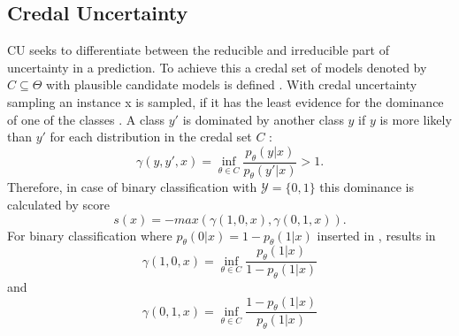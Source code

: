 \subsection{Credal Uncertainty}  
\label{subsec:credal_uncertainty}

\Ac{CU} seeks to differentiate between the reducible and irreducible part of uncertainty in a prediction.
To achieve this a credal set of models denoted by $C \subseteq \Theta$ with plausible candidate models is defined \cite{nguyen2021howtomeasure}.
With credal uncertainty sampling an instance x is sampled, if it has the least evidence for the dominance of one of the classes \cite{nguyen2021howtomeasure}.
A class $y'$ is dominated by another class $y$ if $y$ is more likely than $y'$ for each distribution in the credal set $C$ \cite{nguyen2021howtomeasure}:
\begin{equation} \label{eq:credal_uncertainty_dominance}
\gamma(y,y',x) = \inf_{\theta \in C} \frac{p_{\theta}(y | x)}{p_{\theta}(y' | x)} > 1.
\end{equation} 
Therefore, in case of binary classification with $\mathcal{Y} = \{0, 1\}$ this dominance is calculated by score
\begin{equation}
    s(x) = -max (\gamma(1,0,x), \gamma(0,1,x)).
\end{equation} 
For binary classification where $p_{\theta}(0|x) = 1 - p_{\theta}(1|x)$ inserted in , results in  
\begin{equation}
\gamma(1,0,x) = \inf_{\theta \in C} \frac{p_{\theta}(1 | x)}{1 - p_{\theta}(1 | x)}
\end{equation} 
and
\begin{equation}
\gamma(0,1,x) = \inf_{\theta \in C} \frac{1 - p_{\theta}(1 | x)}{p_{\theta}(1 | x)}
\end{equation} 